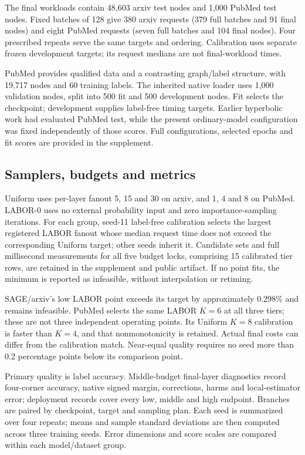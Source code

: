 \documentclass[sigconf, nonacm]{acmart}
\begin{document}
The final workloads contain 48,603 arxiv test nodes and 1,000 PubMed test nodes. Fixed batches of 128 give 380 arxiv requests (379 full batches and 91 final nodes) and eight PubMed requests (seven full batches and 104 final nodes). Four prescribed repeats serve the same targets and ordering. Calibration uses separate frozen development targets; its request medians are not final-workload times.

PubMed provides qualified data and a contrasting graph/label structure, with 19,717 nodes and 60 training labels. The inherited native loader uses 1,000 validation nodes, split into 500 fit and 500 development nodes. Fit selects the checkpoint; development supplies label-free timing targets. Earlier hyperbolic work had evaluated PubMed test, while the present ordinary-model configuration was fixed independently of those scores. Full configurations, selected epochs and fit scores are provided in the supplement.

\subsection{Samplers, budgets and metrics}
Uniform uses per-layer fanout 5, 15 and 30 on arxiv, and 1, 4 and 8 on PubMed. LABOR-0 uses no external probability input and zero importance-sampling iterations. For each group, seed-11 label-free calibration selects the largest registered LABOR fanout whose median request time does not exceed the corresponding Uniform target; other seeds inherit it. Candidate sets and full millisecond measurements for all five budget locks, comprising 15 calibrated tier rows, are retained in the supplement and public artifact. If no point fits, the minimum is reported as infeasible, without interpolation or retiming.

SAGE/arxiv's low LABOR point exceeds its target by approximately 0.298\% and remains infeasible. PubMed selects the same LABOR $K=6$ at all three tiers; these are not three independent operating points. Its Uniform $K=8$ calibration is faster than $K=4$, and that nonmonotonicity is retained. Actual final costs can differ from the calibration match. Near-equal quality requires no seed more than 0.2 percentage points below its comparison point.

Primary quality is label accuracy. Middle-budget final-layer diagnostics record four-corner accuracy, native signed margin, corrections, harms and local-estimator error; deployment records cover every low, middle and high endpoint. Branches are paired by checkpoint, target and sampling plan. Each seed is summarized over four repeats; means and sample standard deviations are then computed across three training seeds. Error dimensions and score scales are compared within each model/dataset group.
\end{document}
